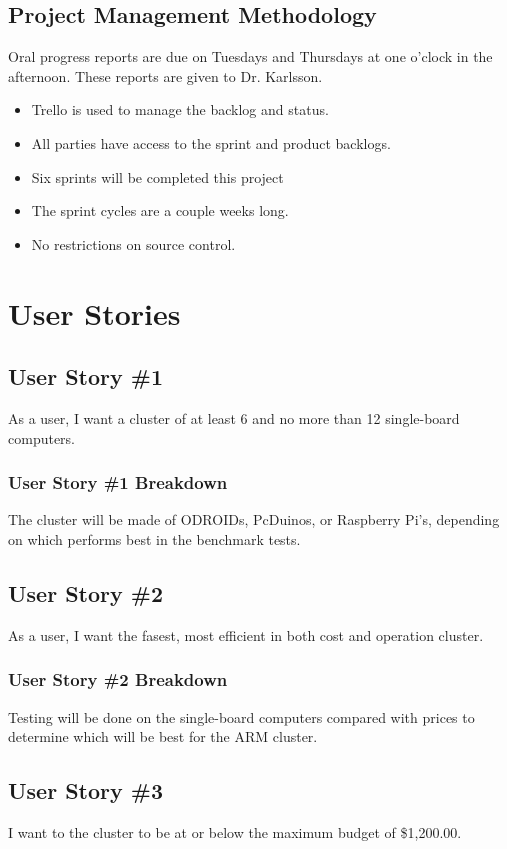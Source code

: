 \subsection{Project  Management Methodology}
Oral progress reports are due on Tuesdays and Thursdays at one o'clock in the 
afternoon. These reports are given to Dr. Karlsson. 
 
\begin{itemize}
\item Trello is used to manage the backlog and status.
\item All parties have access to the sprint and product backlogs.
\item Six sprints will be completed this project
\item The sprint cycles are a couple weeks long.
\item No restrictions on source control.
\end{itemize}

\section{User Stories} 

\subsection{User Story \#1}
As a user, I want a cluster of at least 6 and no more than 12 single-board computers.
\subsubsection{User Story \#1 Breakdown}
The cluster will be made of ODROIDs, PcDuinos, or Raspberry Pi's, depending on which performs best in the benchmark tests.

\subsection{User Story \#2} 
As a user, I want the fasest, most efficient in both cost and operation cluster.
\subsubsection{User Story \#2 Breakdown}
Testing will be done on the single-board computers compared with prices to determine which will be best for the ARM cluster.

\subsection{User Story \#3} 
I want to the cluster to be at or below the maximum budget of \$1,200.00.
